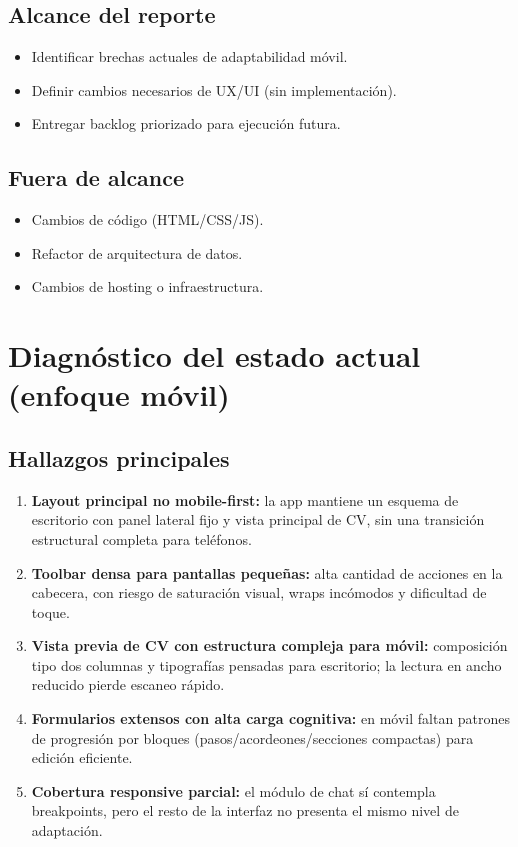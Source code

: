 \documentclass[12pt,a4paper]{article}
\begin{document}
\subsection{Alcance del reporte}
\begin{itemize}[leftmargin=1.2cm]
  \item Identificar brechas actuales de adaptabilidad móvil.
  \item Definir cambios necesarios de UX/UI (sin implementación).
  \item Entregar backlog priorizado para ejecución futura.
\end{itemize}

\subsection{Fuera de alcance}
\begin{itemize}[leftmargin=1.2cm]
  \item Cambios de código (HTML/CSS/JS).
  \item Refactor de arquitectura de datos.
  \item Cambios de hosting o infraestructura.
\end{itemize}

\section{Diagnóstico del estado actual (enfoque móvil)}
\subsection{Hallazgos principales}
\begin{enumerate}[leftmargin=1.2cm]
  \item \textbf{Layout principal no mobile-first:} la app mantiene un esquema de escritorio con panel lateral fijo y vista principal de CV, sin una transición estructural completa para teléfonos.
  \item \textbf{Toolbar densa para pantallas pequeñas:} alta cantidad de acciones en la cabecera, con riesgo de saturación visual, wraps incómodos y dificultad de toque.
  \item \textbf{Vista previa de CV con estructura compleja para móvil:} composición tipo dos columnas y tipografías pensadas para escritorio; la lectura en ancho reducido pierde escaneo rápido.
  \item \textbf{Formularios extensos con alta carga cognitiva:} en móvil faltan patrones de progresión por bloques (pasos/acordeones/secciones compactas) para edición eficiente.
  \item \textbf{Cobertura responsive parcial:} el módulo de chat sí contempla breakpoints, pero el resto de la interfaz no presenta el mismo nivel de adaptación.
\end{enumerate}
\end{document}
